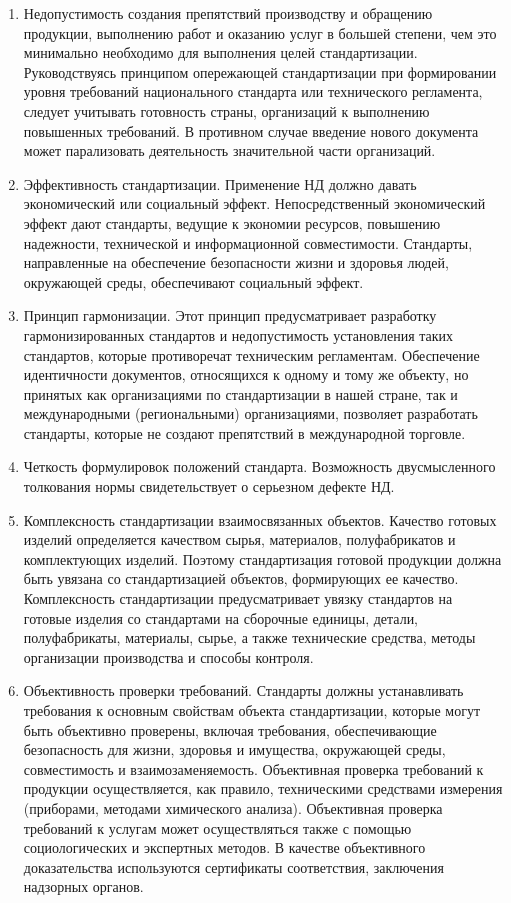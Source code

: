 \begin{enumerate}
\item Недопустимость создания препятствий производству и обращению продукции, выполнению работ и оказанию услуг в большей степени, чем это минимально необходимо для выполнения целей стандартизации. Руководствуясь принципом опережающей стандартизации при формировании уровня требований национального стандарта или технического регламента, следует учитывать готовность страны, организаций к выполнению повышенных требований. В противном случае введение нового документа может парализовать деятельность значительной части организаций.
\item Эффективность стандартизации. Применение НД должно давать экономический или социальный эффект. Непосредственный экономический эффект дают стандарты, ведущие к экономии ресурсов, повышению надежности, технической и информационной совместимости. Стандарты, направленные на обеспечение безопасности жизни и здоровья людей, окружающей среды, обеспечивают социальный эффект.
\item Принцип гармонизации. Этот принцип предусматривает разработку гармонизированных стандартов и недопустимость установления таких стандартов, которые противоречат техническим регламентам. Обеспечение идентичности документов, относящихся к одному и тому же объекту, но принятых как организациями по стандартизации в нашей стране, так и международными (региональными) организациями, позволяет разработать стандарты, которые не создают препятствий в международной торговле.
\item Четкость формулировок положений стандарта. Возможность двусмысленного толкования нормы свидетельствует о серьезном дефекте НД.
\item Комплексность стандартизации взаимосвязанных объектов. Качество готовых изделий определяется качеством сырья, материалов, полуфабрикатов и комплектующих изделий. Поэтому стандартизация готовой продукции должна быть увязана со стандартизацией объектов, формирующих ее качество. Комплексность стандартизации предусматривает увязку стандартов на готовые изделия со стандартами на сборочные единицы, детали, полуфабрикаты, материалы, сырье, а также технические средства, методы организации производства и способы контроля.
\item Объективность проверки требований. Стандарты должны устанавливать требования к основным свойствам объекта стандартизации, которые могут быть объективно проверены, включая требования, обеспечивающие безопасность для жизни, здоровья и имущества, окружающей среды, совместимость и взаимозаменяемость. Объективная проверка требований к продукции осуществляется, как правило, техническими средствами измерения (приборами, методами химического анализа). Объективная проверка требований к услугам может осуществляться также с помощью социологических и экспертных методов. В качестве объективного доказательства используются сертификаты соответствия, заключения надзорных органов.

\end{enumerate}

